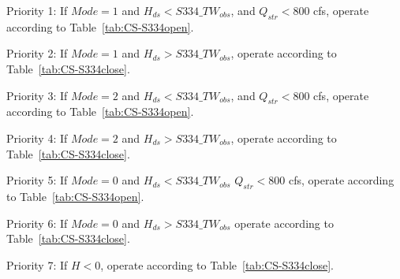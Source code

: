 \begin{packed_items}
\item Priority 1: If $Mode=1$ and $H_{ds}<S334\_TW_{obs}$, and $Q_{str}<800$ cfs,  operate according to Table~\ref{tab:CS-S334open}.
\item Priority 2: If $Mode=1$ and $H_{ds}>S334\_TW_{obs}$,  operate according to Table~\ref{tab:CS-S334close}.
\item[]
\item Priority 3: If $Mode=2$ and $H_{ds}<S334\_TW_{obs}$, and $Q_{str}<800$ cfs, operate according to Table~\ref{tab:CS-S334open}.
\item Priority 4: If $Mode=2$ and $H_{ds}>S334\_TW_{obs}$,  operate according to Table~\ref{tab:CS-S334close}.
\item[]
\item Priority 5: If $Mode=0$ and $H_{ds}<S334\_TW_{obs}$  $Q_{str}<800$ cfs,  operate according to Table~\ref{tab:CS-S334open}.
\item Priority 6: If $Mode=0$ and $H_{ds}>S334\_TW_{obs}$   operate according to Table~\ref{tab:CS-S334close}.
\item[]
\item Priority 7: If $H<0$, operate according to Table~\ref{tab:CS-S334close}.
\end{packed_items}

%


